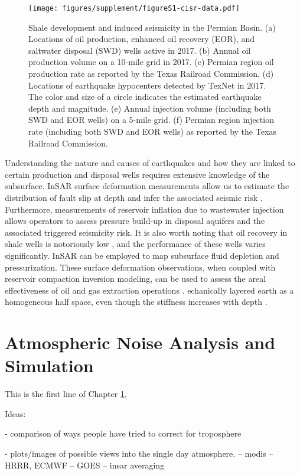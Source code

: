 \documentclass{utexasthesis}
\begin{document}
\begin{figure}[hbt!]
\centering
\texttt{[image: figures/supplement/figureS1-cisr-data.pdf]}
\caption{Shale development and induced seismicity in the Permian Basin. 
(a) Locations of oil production, enhanced oil recovery (EOR), and saltwater disposal (SWD) wells active in 2017. (b) Annual oil production volume on a 10-mile grid in 2017. (c) Permian region oil production rate as reported by the Texas Railroad Commission. (d) Locations of earthquake hypocenters detected by TexNet in 2017. The color and size of a circle indicates the estimated earthquake depth and magnitude. (e) Annual injection volume (including both SWD and EOR wells) on a 5-mile grid. (f) Permian region injection rate (including both SWD and EOR wells) as reported by the Texas Railroad Commission.
}
\label{fig:Permian}
\end{figure}

Understanding the nature and causes of earthquakes and how they are linked to certain production and disposal wells requires extensive knowledge of the subsurface. InSAR surface deformation measurements allow us to estimate the distribution of fault slip at depth and infer the associated seismic risk \cite{Segall2010, huang2017fault}. Furthermore, measurements of reservoir inflation due to wastewater injection allows operators to assess pressure build-up in disposal aquifers and the associated triggered seismicity risk. It is also worth noting that oil recovery in shale wells is notoriously low \cite{clark2009determination}, and the performance of these wells varies significantly. InSAR can be employed to map subsurface fluid depletion and pressurization. These surface deformation observations, when coupled with reservoir compaction inversion modeling, can be used to assess the areal effectiveness of oil and gas extraction operations \cite{Du2001, Vasco2005}. 
echanically layered earth as a homogeneous half space, even though the stiffness increases with depth \cite{Du1992}. 


\chapter{Atmospheric Noise Analysis and Simulation}
\label{chap:atmo-noise}

This is the first line of Chapter \ref{chap:atmo-noise}, 


Ideas:

- comparison of ways people have tried to correct for troposphere

- plots/images of possible views into the single day atmosphere.
 -- modis
 -- HRRR, ECMWF
 --  GOES
 -- insar averaging
 
\end{document}
